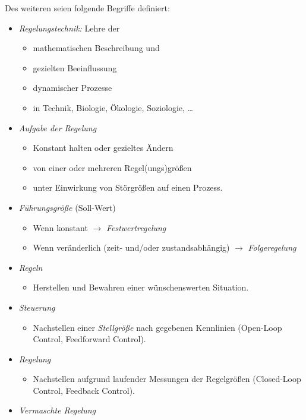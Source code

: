 \documentclass[a4paper, 11pt, accentcolor = tud3b]{tudreport}
\begin{document}
				Des weiteren seien folgende Begriffe definiert:
				\begin{itemize}
					\item \emph{Regelungstechnik:} Lehre der
						\begin{itemize}
							\item mathematischen Beschreibung und
							\item gezielten Beeinflussung
							\item dynamischer Prozesse
							\item in Technik, Biologie, Ökologie, Soziologie, \dots
						\end{itemize}
					\item \emph{Aufgabe der Regelung}
						\begin{itemize}
							\item Konstant halten oder gezieltes Ändern
							\item von einer oder mehreren Regel(ungs)größen
							\item unter Einwirkung von Störgrößen auf einen Prozess.
						\end{itemize}
					\item \emph{Führungsgröße} (Soll-Wert)
						\begin{itemize}
							\item Wenn konstant \(\to\) \emph{Festwertregelung}
							\item Wenn veränderlich (zeit- und/oder zustandsabhängig) \(\to\) \emph{Folgeregelung}
						\end{itemize}
					\item \emph{Regeln}
						\begin{itemize}
							\item Herstellen und Bewahren einer wünschenswerten Situation.
						\end{itemize}
					\item \emph{Steuerung}
						\begin{itemize}
							\item Nachstellen einer \emph{Stellgröße} nach gegebenen Kennlinien (Open-Loop Control, Feedforward Control).
						\end{itemize}
					\item \emph{Regelung}
						\begin{itemize}
							\item Nachstellen aufgrund laufender Messungen der Regelgrößen (Closed-Loop Control, Feedback Control).
						\end{itemize}
					\item \emph{Vermaschte Regelung}

\end{itemize}
\end{document}
